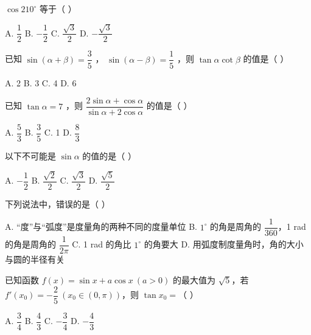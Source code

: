 \documentclass[11pt, a4paper]{article}
\begin{document}
\begin{baitap}[6]
$\cos 210^\circ$ 等于（ ）
\par\vspace{3pt}
\noindent A. $\dfrac{1}{2}$ \quad B. $-\dfrac{1}{2}$ \quad C. $\dfrac{\sqrt{3}}{2}$ \quad D. $-\dfrac{\sqrt{3}}{2}$
\end{baitap}

\begin{baitap}[7]
已知 $\sin(\alpha + \beta) = \dfrac{3}{5}$ ， $\sin(\alpha - \beta) = \dfrac{1}{5}$ ，则 $\tan\alpha \cot\beta$ 的值是（ ）
\par\vspace{3pt}
\noindent A. 2 \quad B. 3 \quad C. 4 \quad D. 6
\end{baitap}

\begin{baitap}[8]
已知 $\tan\alpha = 7$ ，则 $\dfrac{2\sin\alpha + \cos\alpha}{\sin\alpha + 2\cos\alpha}$ 的值是（ ）
\par\vspace{3pt}
\noindent A. $\dfrac{5}{3}$ \quad B. $\dfrac{3}{5}$ \quad C. 1 \quad D. $\dfrac{8}{3}$
\end{baitap}

\begin{baitap}[9]
以下不可能是 $\sin \alpha$ 的值的是（ ）
\par\vspace{3pt}
\noindent A. $-\dfrac{1}{2}$ \quad B. $\dfrac{\sqrt{2}}{2}$ \quad C. $\dfrac{\sqrt{3}}{2}$ \quad D. $\dfrac{\sqrt{5}}{2}$
\end{baitap}

\begin{baitap}[10]
下列说法中，错误的是（ ）
\par\vspace{3pt}
\noindent A. “度”与“弧度”是度量角的两种不同的度量单位 \quad B. $1^{\circ}$ 的角是周角的 $\dfrac{1}{360}$，1 rad 的角是周角的 $\dfrac{1}{2\pi}$ \quad C. 1 rad 的角比 $1^{\circ}$ 的角要大 \quad D. 用弧度制度量角时，角的大小与圆的半径有关
\end{baitap}

\begin{baitap}[11]
已知函数 $f(x) = \sin x + a\cos x \ (a > 0)$ 的最大值为 $\sqrt{5}$，若 $f'(x_0) = -\dfrac{2}{5} \ (x_0 \in (0, \pi))$，则 $\tan x_0 =$（ ）
\par\vspace{3pt}
\noindent A. $\dfrac{3}{4}$ \quad B. $\dfrac{4}{3}$ \quad C. $-\dfrac{3}{4}$ \quad D. $-\dfrac{4}{3}$
\end{baitap}
\end{document}
